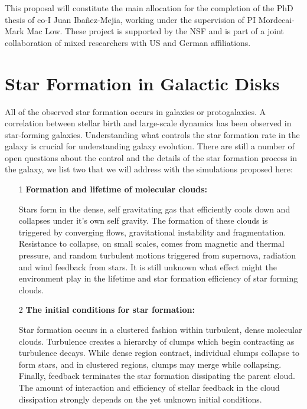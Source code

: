 \documentclass[12pt,a4paper]{article}
\begin{document}
This proposal will constitute the main allocation for the completion of the PhD thesis of co-I Juan Iba\~nez-Mejia, working under the supervision of PI Mordecai-Mark Mac Low. 
These project is supported by the NSF and is part of a joint collaboration of mixed researchers with US and German affiliations.



\section{Star Formation in Galactic Disks}
	
All of the observed star formation occurs in galaxies or protogalaxies. 
A correlation between stellar birth and large-scale dynamics has been observed in star-forming galaxies. 
Understanding what controls the star formation rate in the galaxy is crucial for understanding galaxy evolution.  
There are still a number of open questions about the control and the details of the star formation process in the galaxy, we list two that we will address with the simulations proposed here:

\begin{itemize}

	\item[1] \textbf{Formation and lifetime of molecular clouds: }

		Stars form in the dense, self gravitating gas that efficiently cools down and collapses under it's own self gravity. 
		The formation of these clouds is triggered by converging flows, gravitational instability and fragmentation.
		Resistance to collapse, on small scales, comes from magnetic and thermal pressure, and random turbulent motions triggered from supernova, radiation and wind feedback from stars.
		It is still unknown what effect might the environment play in the lifetime and star formation efficiency of star forming clouds.
			
	\item[2] \textbf{The initial conditions for star formation: }

		Star formation occurs in a clustered fashion within turbulent, dense molecular clouds.
		Turbulence creates a hierarchy of clumps which begin contracting as turbulence decays.
		While dense region contract, individual clumps collapse to form stars, and in clustered regions, clumps may merge while collapsing.
		Finally, feedback terminates the star formation dissipating the parent cloud.
		The amount of interaction and efficiency of stellar feedback in the cloud dissipation strongly depends on the yet unknown initial conditions.



\end{itemize}
\end{document}
